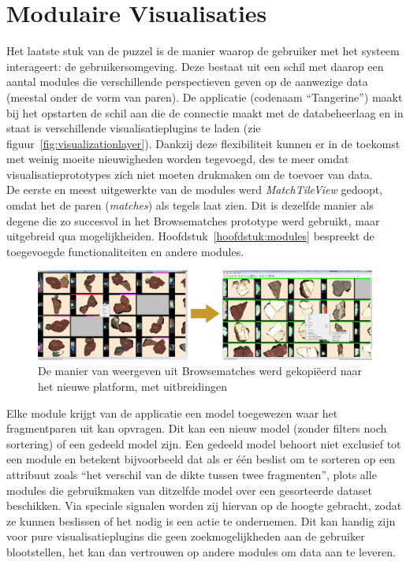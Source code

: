 \section{Modulaire Visualisaties}
Het laatste stuk van de puzzel is de manier waarop de gebruiker met het systeem interageert: de gebruikersomgeving. Deze bestaat uit een schil met daarop een aantal modules die verschillende perspectieven geven op de aanwezige data (meestal onder de vorm van paren). De applicatie (codenaam ``Tangerine'') maakt bij het opstarten de schil aan die de connectie maakt met de databeheerlaag en in staat is verschillende visualisatieplugins te laden (zie figuur~\ref{fig:visualizationlayer}). Dankzij deze flexibiliteit kunnen er in de toekomst met weinig moeite nieuwigheden worden tegevoegd, des te meer omdat visualisatieprototypes zich niet moeten drukmaken om de toevoer van data.\\

De eerste en meest uitgewerkte van de modules werd \emph{MatchTileView} gedoopt, omdat het de paren (\emph{matches}) als tegels laat zien. Dit is dezelfde manier als degene die zo succesvol in het Browsematches prototype werd gebruikt, maar uitgebreid qua mogelijkheiden. Hoofdstuk~\ref{hoofdstuk:modules} bespreekt de toegevoegde functionaliteiten en andere modules.\\

\begin{figure}[ht]
	\begin{center}
		\includegraphics[width=1.0\columnwidth]{images/browsematches-to-tangerine-01.png}
		\caption{De manier van weergeven uit Browsematches werd gekopi\"eerd naar het nieuwe platform, met uitbreidingen}
		\label{fig:browsematchestotang}
	\end{center}
\end{figure}

Elke module krijgt van de applicatie een model toegewezen waar het fragmentparen uit kan opvragen. Dit kan een nieuw model (zonder filters noch sortering) of een gedeeld model zijn. Een gedeeld model behoort niet exclusief tot een module en betekent bijvoorbeeld dat als er \'e\'en beslist om te sorteren op een attribuut zoals ``het verschil van de dikte tussen twee fragmenten'', plots alle modules die gebruikmaken van ditzelfde model over een gesorteerde dataset beschikken. Via speciale signalen worden zij hiervan op de hoogte gebracht, zodat ze kunnen beslissen of het nodig is een actie te ondernemen. Dit kan handig zijn voor pure visualisatieplugins die geen zoekmogelijkheden aan de gebruiker blootstellen, het kan dan vertrouwen op andere modules om data aan te leveren.\\

